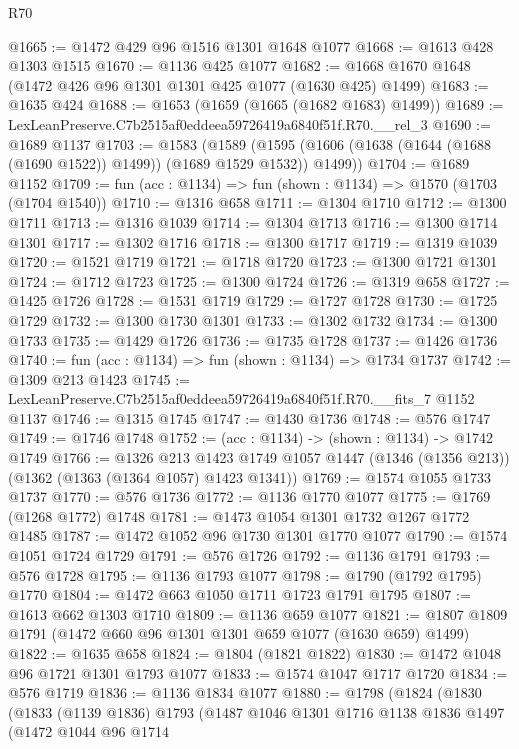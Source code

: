 \begin{lexlean}{R70}
\begin{coremodule}
@1665 := @1472 @429 @96 @1516 @1301 @1648 @1077
@1668 := @1613 @428 @1303 @1515
@1670 := @1136 @425 @1077
@1682 := @1668 @1670 @1648 (@1472 @426 @96 @1301 @1301 @425 @1077 (@1630 @425) @1499)
@1683 := @1635 @424
@1688 := @1653 (@1659 (@1665 (@1682 @1683) @1499))
@1689 := LexLeanPreserve.C7b2515af0eddeea59726419a6840f51f.R70.__rel_3
@1690 := @1689 @1137
@1703 := @1583
    (@1589 (@1595 (@1606 (@1638 (@1644 (@1688 (@1690 @1522)) @1499)) (@1689 @1529 @1532)) @1499))
@1704 := @1689 @1152
@1709 := fun (acc : @1134) => fun (shown : @1134) => @1570 (@1703 (@1704 @1540))
@1710 := @1316 @658
@1711 := @1304 @1710
@1712 := @1300 @1711
@1713 := @1316 @1039
@1714 := @1304 @1713
@1716 := @1300 @1714 @1301
@1717 := @1302 @1716
@1718 := @1300 @1717
@1719 := @1319 @1039
@1720 := @1521 @1719
@1721 := @1718 @1720
@1723 := @1300 @1721 @1301
@1724 := @1712 @1723
@1725 := @1300 @1724
@1726 := @1319 @658
@1727 := @1425 @1726
@1728 := @1531 @1719
@1729 := @1727 @1728
@1730 := @1725 @1729
@1732 := @1300 @1730 @1301
@1733 := @1302 @1732
@1734 := @1300 @1733
@1735 := @1429 @1726
@1736 := @1735 @1728
@1737 := @1426 @1736
@1740 := fun (acc : @1134) => fun (shown : @1134) => @1734 @1737
@1742 := @1309 @213 @1423
@1745 := LexLeanPreserve.C7b2515af0eddeea59726419a6840f51f.R70.__fits_7 @1152 @1137
@1746 := @1315 @1745
@1747 := @1430 @1736
@1748 := @576 @1747
@1749 := @1746 @1748
@1752 := (acc : @1134) -> (shown : @1134) -> @1742 @1749
@1766 := @1326
    @213
    @1423
    @1749
    @1057
    @1447
    (@1346 (@1356 @213))
    (@1362 (@1363 (@1364 @1057) @1423 @1341))
@1769 := @1574 @1055 @1733 @1737
@1770 := @576 @1736
@1772 := @1136 @1770 @1077
@1775 := @1769 (@1268 @1772) @1748
@1781 := @1473 @1054 @1301 @1732 @1267 @1772 @1485
@1787 := @1472 @1052 @96 @1730 @1301 @1770 @1077
@1790 := @1574 @1051 @1724 @1729
@1791 := @576 @1726
@1792 := @1136 @1791
@1793 := @576 @1728
@1795 := @1136 @1793 @1077
@1798 := @1790 (@1792 @1795) @1770
@1804 := @1472 @663 @1050 @1711 @1723 @1791 @1795
@1807 := @1613 @662 @1303 @1710
@1809 := @1136 @659 @1077
@1821 := @1807 @1809 @1791 (@1472 @660 @96 @1301 @1301 @659 @1077 (@1630 @659) @1499)
@1822 := @1635 @658
@1824 := @1804 (@1821 @1822)
@1830 := @1472 @1048 @96 @1721 @1301 @1793 @1077
@1833 := @1574 @1047 @1717 @1720
@1834 := @576 @1719
@1836 := @1136 @1834 @1077
@1880 := @1798
    (@1824
      (@1830
        (@1833
          (@1139 @1836)
          @1793
          (@1487
            @1046
            @1301
            @1716
            @1138
            @1836
            @1497
            (@1472
              @1044
              @96
              @1714

\end{coremodule}
\end{lexlean}
